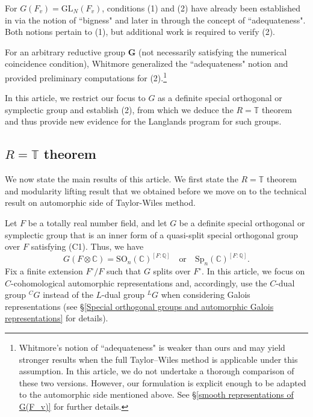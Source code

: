 \documentclass[12pt,oneside,reqno]{amsart}
\newcommand{\T}{\mathbb{T}}
\theoremstyle{plain}
\begin{document}
	For $G(F_v) = \mathrm{GL}_N(F_v)$, conditions (1) and (2) have already been established in \cite{ClozelHarrisTaylor2008} via the notion of ``bigness" and later in \cite{Thorne2012} through the concept of ``adequateness". Both notions pertain to (1), but additional work is required to verify (2).
	
	For an arbitrary reductive group $\mathbf{G}$ (not necessarily satisfying the numerical coincidence condition), Whitmore \cite{Whitmore2022} generalized the ``adequateness" notion and provided preliminary computations for (2).\footnote{Whitmore’s notion of ``adequateness" is weaker than ours and may yield stronger results when the full Taylor–Wiles method is applicable under this assumption. In this article, we do not undertake a thorough comparison of these two versions. However, our formulation is explicit enough to be adapted to the automorphic side mentioned above. See \S\ref{smooth representations of G(F_v)} for further details.}
	
	
	
	
	
	
	In this article, we restrict our focus to $G$ as a definite special orthogonal or symplectic group and establish (2), from which we deduce the $R = \mathbb{T}$ theorem and thus provide new evidence for the Langlands program for such groups.
	
	
	
	\subsection*{$R=\T$ theorem}
	We now state the main results of this article. We first state the $R=\T$ theorem and modularity lifting result that we obtained before we move on to the technical result on automorphic side of Taylor-Wiles method.
	
	
	
	Let $F$ be a totally real number field, and let $G$ be a definite special orthogonal or symplectic group that is an inner form of a quasi-split special orthogonal group over $F$ satisfying (C1). Thus, we have  
	\[
	G(F \otimes \mathbb{C}) = \mathrm{SO}_n(\mathbb{C})^{[F:\mathbb{Q}]} \quad \text{or} \quad \mathrm{Sp}_n(\mathbb{C})^{[F:\mathbb{Q}]}.
	\]  
	Fix a finite extension $F^\circ/F$ such that $G$ splits over $F^\circ$. In this article, we focus on $C$-cohomological automorphic representations and, accordingly, use the $C$-dual group ${}^C G$ instead of the $L$-dual group ${}^L G$ when considering Galois representations (see §\ref{Special orthogonal groups and automorphic Galois representations} for details).  
	
\end{document}
